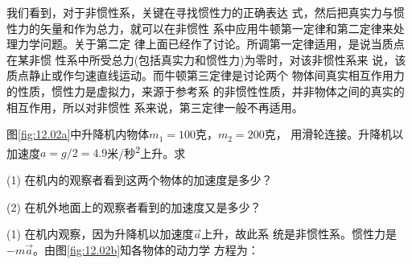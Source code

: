 我们看到，对于非惯性系，关键在寻找惯性力的正确表达
式，然后把真实力与惯性力的矢量和作为总力，就可以在非惯性
系中应用牛顿第一定律和第二定律来处理力学问题。关于第二定
律上面已经作了讨论。所调第一定律适用，是说当质点在某非惯
性系中所受总力(包括真实力和惯性力)为零时，对该非惯性系来
说，该质点静止或作匀速直线运动。而牛顿第三定律是讨论两个
物体间真实相互作用力的性质，惯性力是虚拟力，来源于参考系
的非惯性性质，并非物体之间的真实的相互作用，所以对非惯性
系来说，第三定律一般不再适用。

\begin{figurex}
    \vspace{1em}
    \centering
    \caption{}
    \label{fig:12.02}
    \vspace{0.5em}
\end{figurex}

\example 图\ref{fig:12.02a}中升降机内物体$  m _ { 1 } = 1 0 0   $克，$  m _ { 2 } = 2 0 0   $克，
用滑轮连接。升降机以加速度$ a = g / 2 = 4 . 9 $米/秒\textsuperscript{2}上升。求

(1) 在机内的观察者看到这两个物体的加速度是多少？

(2) 在机外地面上的观察者看到的加速度又是多少？

\solution (1) 在机内观察，因为升降机以加速度$\vec{a}$上升，故此系
统是非惯性系。惯性力是$ -m\vec{a} $。由图\ref{fig:12.02b}知各物体的动力学
方程为：

